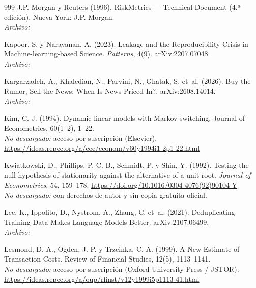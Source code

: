 \begin{thebibliography}{999}
J.P. Morgan y Reuters (1996). RiskMetrics — Technical Document (4.ª edición). Nueva York: J.P. Morgan.
\\\textit{Archivo:} 

Kapoor, S. y Narayanan, A. (2023). Leakage and the Reproducibility Crisis in Machine-learning-based Science. \emph{Patterns}, 4(9). arXiv:2207.07048.
\\\textit{Archivo:} 

Kargarzadeh, A., Khaledian, N., Parvini, N., Ghatak, S. et~al. (2026). Buy the Rumor, Sell the News: When Is News Priced In?. arXiv:2608.14014.
\\\textit{Archivo:} 

Kim, C.-J. (1994). Dynamic linear models with Markov-switching. Journal of Econometrics, 60(1–2), 1–22.
\\\textit{No descargado:} acceso por suscripción (Elsevier). \url{https://ideas.repec.org/a/eee/econom/v60y1994i1-2p1-22.html}

Kwiatkowski, D., Phillips, P. C. B., Schmidt, P. y Shin, Y. (1992). Testing the null hypothesis of stationarity against the alternative of a unit root. \emph{Journal of Econometrics}, 54, 159--178. \url{https://doi.org/10.1016/0304-4076(92)90104-Y}
\\\textit{No descargado:} con derechos de autor y sin copia gratuita oficial.

Lee, K., Ippolito, D., Nystrom, A., Zhang, C. et~al. (2021). Deduplicating Training Data Makes Language Models Better. arXiv:2107.06499.
\\\textit{Archivo:} 

Lesmond, D. A., Ogden, J. P. y Trzcinka, C. A. (1999). A New Estimate of Transaction Costs. Review of Financial Studies, 12(5), 1113–1141.
\\\textit{No descargado:} acceso por suscripción (Oxford University Press / JSTOR). \url{https://ideas.repec.org/a/oup/rfinst/v12y1999i5p1113-41.html}


\end{thebibliography}
